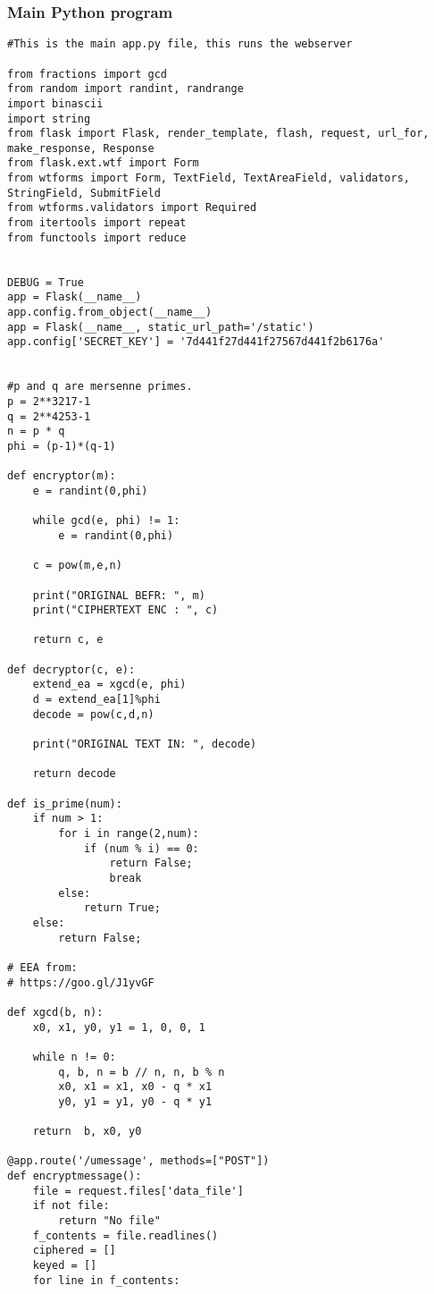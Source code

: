 \documentclass[a4paper]{article}
\begin{document}
\subsubsection{Main Python program}
\begin{verbatim}
#This is the main app.py file, this runs the webserver

from fractions import gcd
from random import randint, randrange
import binascii
import string
from flask import Flask, render_template, flash, request, url_for, make_response, Response
from flask.ext.wtf import Form
from wtforms import Form, TextField, TextAreaField, validators, StringField, SubmitField
from wtforms.validators import Required
from itertools import repeat
from functools import reduce


DEBUG = True
app = Flask(__name__)
app.config.from_object(__name__)
app = Flask(__name__, static_url_path='/static')
app.config['SECRET_KEY'] = '7d441f27d441f27567d441f2b6176a'


#p and q are mersenne primes.
p = 2**3217-1
q = 2**4253-1
n = p * q
phi = (p-1)*(q-1)

def encryptor(m):
    e = randint(0,phi)   
    
    while gcd(e, phi) != 1:
        e = randint(0,phi)
    
    c = pow(m,e,n)

    print("ORIGINAL BEFR: ", m)
    print("CIPHERTEXT ENC : ", c)
    
    return c, e

def decryptor(c, e):
    extend_ea = xgcd(e, phi)  
    d = extend_ea[1]%phi
    decode = pow(c,d,n)
   
    print("ORIGINAL TEXT IN: ", decode)
   
    return decode

def is_prime(num):
    if num > 1:
        for i in range(2,num):
            if (num % i) == 0:
                return False;
                break
        else:
            return True;
    else:
        return False;

# EEA from:
# https://goo.gl/J1yvGF

def xgcd(b, n):
    x0, x1, y0, y1 = 1, 0, 0, 1
    
    while n != 0:
        q, b, n = b // n, n, b % n
        x0, x1 = x1, x0 - q * x1
        y0, y1 = y1, y0 - q * y1
    
    return  b, x0, y0

@app.route('/umessage', methods=["POST"])
def encryptmessage():
    file = request.files['data_file']
    if not file:
        return "No file"
    f_contents = file.readlines()
    ciphered = []
    keyed = []
    for line in f_contents:


\end{verbatim}
\end{document}
